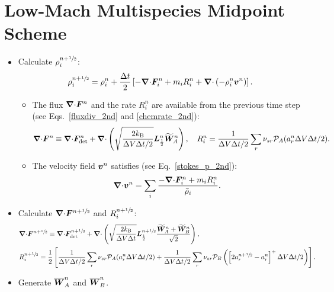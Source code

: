 \documentclass[
10pt
showpacs, showkeys,
amsmath,amssymb,
aps,
pre,
floatfix,
]{revtex4-1}
\newcommand{\divg}{{\V\nabla\cdot}}                       %
\begin{document}
\section*{Low-Mach Multispecies Midpoint Scheme}

\begin{itemize}

\item Calculate $\rho^{n+\sfrac{1}{2}}_i$:
\begin{equation}
\rho^{n+\myhalf}_i = \rho^n_i + \frac{\D{t}}{2} \left[ -\divg\V{F}^n_i + m_i R^n_i + \divg\left( -\rho^n_i \V{v}^n \right) \right].
\end{equation}
\begin{itemize}
\item The flux $\divg\V{F}^n$ and the rate $R^n_i$ are available from the previous time step (see Eqs.~\eqref{fluxdiv_2nd} and \eqref{chemrate_2nd}):
\begin{equation}
\divg\V{F}^n \equiv \divg\V{F}^n_\mathrm{det} + \divg\left( \sqrt{ \frac{2k_\mathrm{B}}{\D{V}\D{t}/2} } \V{L}^n_{\frac12} \widetilde{\V{W}}^n_A \right),
\quad R^n_i = \frac{1}{\D{V}\D{t}/2} \sum_r \nu_{sr} \mathcal{P}_A(a^n_r\D{V}\D{t}/2).
\end{equation}
\item The velocity field $\boldsymbol{v}^n$ satisfies (see Eq.~\eqref{stokes_p_2nd}):
\begin{equation}
\divg\V{v}^n = \sum_i \frac{ -\divg\V{F}^n_i + m_i R^n_i }{\bar{\rho}_i}.
\end{equation}
\end{itemize}


\item Calculate $\divg\V{F}^{n+\myhalf}$ and $R^{n+\sfrac{1}{2}}_i$:
\begin{align}
&\divg\V{F}^{n+\myhalf} \equiv \divg\V{F}_\mathrm{det}^{n+\myhalf} + \divg\left( \sqrt{ \frac{2k_\mathrm{B}}{\D{V}\D{t}} } \V{L}^{n+\myhalf}_{\frac12} \frac{ \widetilde{\V{W}}^n_A + \widetilde{\V{W}}^n_B }{\sqrt{2}} \right), \\
&R^{n+\myhalf}_i = \frac{1}{2}\left[ \frac{1}{\D{V}\D{t}/2} \sum_r \nu_{sr} \mathcal{P}_A(a^n_r\D{V}\D{t}/2) + \frac{1}{\D{V}\D{t}/2} \sum_r \nu_{sr} \mathcal{P}_B\left( \left[ 2 a^{n+\myhalf}_r - a^n_r \right]^+ \D{V}\D{t}/2 \right) \right].
\end{align}

\item Generate $\overline{\boldsymbol{W}}^n_A$ and $\overline{\boldsymbol{W}}^n_B$.


\end{itemize}
\end{document}
